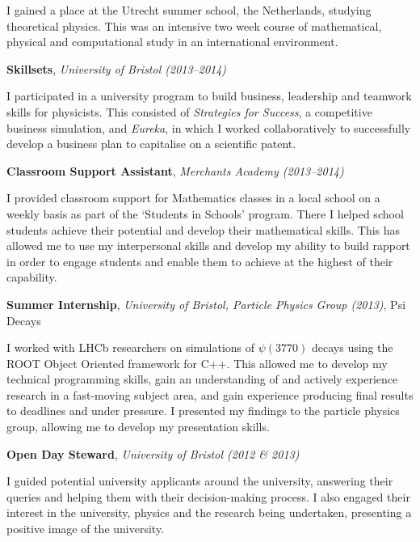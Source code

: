 \documentclass[11pt,a4paper,sans]{moderncv}
\begin{document}
I gained a place at the Utrecht summer school, the Netherlands, studying
theoretical physics. This was an intensive two week course of mathematical,
physical and computational study in an international environment.

\vspace{1em}

{\large\textbf{Skillsets}, \textit{University of Bristol (2013--2014)}}

I participated in a university program to build business, leadership and
teamwork skills for physicists. This consisted of \textit{Strategies for
Success}, a competitive business simulation, and \textit{Eureka}, in which I
worked collaboratively to successfully develop a business plan to capitalise on
a scientific patent.

\vspace{1em}

{\large\textbf{Classroom Support Assistant}, \textit{Merchants Academy (2013--2014)}}

I provided classroom support for Mathematics classes in a local school on a
weekly basis as part of the `Students in Schools' program. There I helped school
students achieve their potential and develop their mathematical skills. This has
allowed me to use my interpersonal skills and develop my ability to build
rapport in order to engage students and enable them to achieve at the highest of
their capability.

\vspace{1em}

{\large\textbf{Summer Internship}, \textit{University of Bristol, Particle
Physics Group (2013)}, Psi Decays}

I worked with LHCb researchers on simulations of $\psi(3770)$ decays using the
ROOT Object Oriented framework for C++. This allowed me to develop my technical
programming skills, gain an understanding of and actively experience research in
a fast-moving subject area, and gain experience producing final results to
deadlines and under pressure. I presented my findings to the particle physics
group, allowing me to develop my presentation skills.
    
\vspace{1em}

{\large\textbf{Open Day Steward}, \textit{University of Bristol (2012 \& 2013)}
}

I guided potential university applicants around the university, answering their
queries and helping them with their decision-making process. I also engaged
their interest in the university, physics and the research being undertaken,
presenting a positive image of the university.
    
\end{document}
